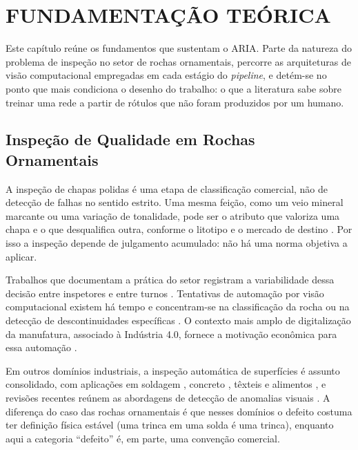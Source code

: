 \chapter[FUNDAMENTAÇÃO TEÓRICA]{FUNDAMENTAÇÃO TEÓRICA}

Este capítulo reúne os fundamentos que sustentam o ARIA. Parte da natureza do problema de inspeção no setor de rochas ornamentais, percorre as arquiteturas de visão computacional empregadas em cada estágio do \textit{pipeline}, e detém-se no ponto que mais condiciona o desenho do trabalho: o que a literatura sabe sobre treinar uma rede a partir de rótulos que não foram produzidos por um humano.

\section{Inspeção de Qualidade em Rochas Ornamentais}

A inspeção de chapas polidas é uma etapa de classificação comercial, não de detecção de falhas no sentido estrito. Uma mesma feição, como um veio mineral marcante ou uma variação de tonalidade, pode ser o atributo que valoriza uma chapa e o que desqualifica outra, conforme o litotipo e o mercado de destino \cite{stone_inspection_vidal2013}. Por isso a inspeção depende de julgamento acumulado: não há uma norma objetiva a aplicar.

Trabalhos que documentam a prática do setor registram a variabilidade dessa decisão entre inspetores e entre turnos \cite{stone_subjectivity_castro2018}. Tentativas de automação por visão computacional existem há tempo e concentram-se na classificação da rocha ou na detecção de descontinuidades específicas \cite{stone_lopez2010, stone_tereso2020}. O contexto mais amplo de digitalização da manufatura, associado à Indústria 4.0, fornece a motivação econômica para essa automação \cite{industry40_lee2014}.

Em outros domínios industriais, a inspeção automática de superfícies é assunto consolidado, com aplicações em soldagem \cite{avi_welding_tsuzuki2022}, concreto \cite{avi_concrete_waqar2024}, têxteis \cite{avi_textile_sikka2024} e alimentos \cite{avi_food_chen2021}, e revisões recentes reúnem as abordagens de detecção de anomalias visuais \cite{avi_anomaly_li2025}. A diferença do caso das rochas ornamentais é que nesses domínios o defeito costuma ter definição física estável (uma trinca em uma solda é uma trinca), enquanto aqui a categoria ``defeito'' é, em parte, uma convenção comercial.

